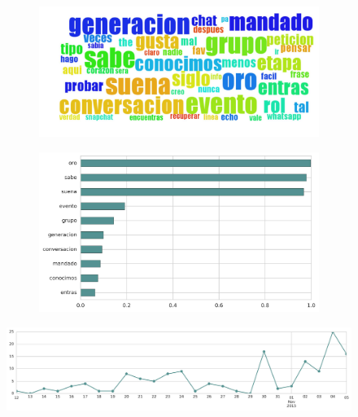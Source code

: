 \begin{figure}[htbp!]
    \centering
    \begin{subfigure}[b]{0.49\textwidth}
        \includegraphics[width=\textwidth]{twitter_all/report_images/topic-31-wordcloud.jpg}
    \end{subfigure}
    \begin{subfigure}[b]{0.49\textwidth}
        \includegraphics[width=\textwidth]{twitter_all/report_images/topic-31-terms.jpg}
    \end{subfigure}
\end{figure}

\begin{figure}[htbp!]
    \centering
    \includegraphics[width=\textwidth]{twitter_all/report_images/topic-31-timeseries.jpg}
\end{figure}


